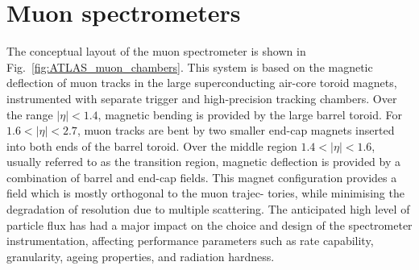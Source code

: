 \section{Muon spectrometers}
\label{sec:ATLAS_muon_chambers}

\begin{figure}
\end{figure}


The conceptual layout of the muon spectrometer is shown in Fig.~\ref{fig:ATLAS_muon_chambers}. This system is based on the magnetic
deflection of muon tracks in the large superconducting air-core toroid magnets, instrumented with
separate trigger and high-precision tracking chambers. Over the range $|\eta| < 1.4$, magnetic bending
is provided by the large barrel toroid. For $1.6 < |\eta| < 2.7$, muon tracks are bent by two smaller
end-cap magnets inserted into both ends of the barrel toroid. Over the middle region $1.4 < |\eta| < 1.6$, usually referred
to as the transition region, magnetic deflection is provided by a combination of barrel and end-cap
fields. This magnet configuration provides a field which is mostly orthogonal to the muon trajec-
tories, while minimising the degradation of resolution due to multiple scattering. The anticipated
high level of particle flux has had a major impact on the choice and design of the spectrometer instrumentation,
affecting performance parameters such as rate capability, granularity, ageing
properties, and radiation hardness.

